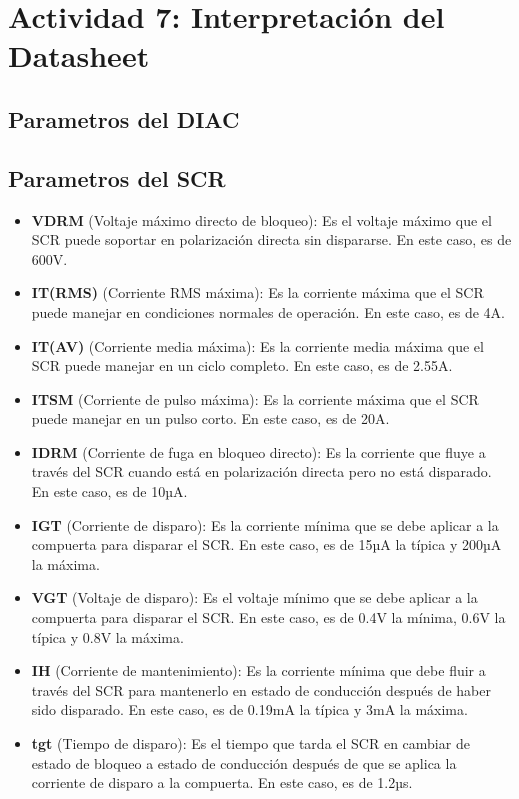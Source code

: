 \newpage

\section{Actividad 7: Interpretación del Datasheet}

\subsection{Parametros del DIAC}

\subsection{Parametros del SCR}

\begin{itemize}
    \item \textbf{VDRM} (Voltaje máximo directo de bloqueo): Es el voltaje máximo que el SCR puede soportar en polarización directa sin dispararse. En este caso, es de 600V.
    \item \textbf{IT(RMS)} (Corriente RMS máxima): Es la corriente máxima que el SCR puede manejar en condiciones normales de operación. En este caso, es de 4A.
    \item \textbf{IT(AV)} (Corriente media máxima): Es la corriente media máxima que el SCR puede manejar en un ciclo completo. En este caso, es de 2.55A.
    \item \textbf{ITSM} (Corriente de pulso máxima): Es la corriente máxima que el SCR puede manejar en un pulso corto. En este caso, es de 20A.
    \item \textbf{IDRM} (Corriente de fuga en bloqueo directo): Es la corriente que fluye a través del SCR cuando está en polarización directa pero no está disparado. En este caso, es de 10µA.
    \item \textbf{IGT} (Corriente de disparo): Es la corriente mínima que se debe aplicar a la compuerta para disparar el SCR. En este caso, es de 15µA la típica y 200µA la máxima.
    \item \textbf{VGT} (Voltaje de disparo): Es el voltaje mínimo que se debe aplicar a la compuerta para disparar el SCR. En este caso, es de 0.4V la mínima, 0.6V la típica y 0.8V la máxima.
    \item \textbf{IH} (Corriente de mantenimiento): Es la corriente mínima que debe fluir a través del SCR para mantenerlo en estado de conducción después de haber sido disparado. En este caso, es de 0.19mA la típica y 3mA la máxima.
    \item \textbf{tgt} (Tiempo de disparo): Es el tiempo que tarda el SCR en cambiar de estado de bloqueo a estado de conducción después de que se aplica la corriente de disparo a la compuerta. En este caso, es de 1.2µs.

\end{itemize}
